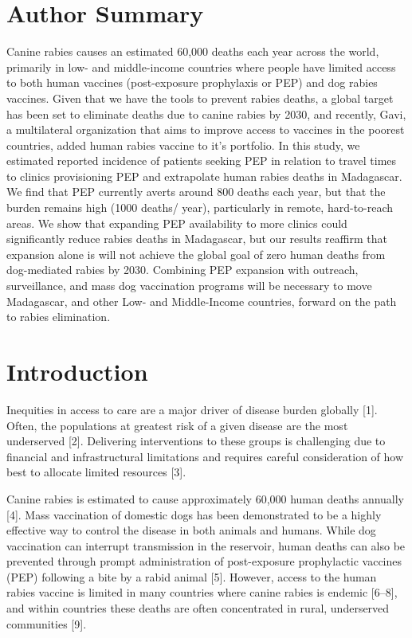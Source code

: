 \documentclass[
]{book}
\begin{document}
\hypertarget{author-summary}{%
\section*{Author Summary}\label{author-summary}}

Canine rabies causes an estimated 60,000 deaths each year across the
world, primarily in low- and middle-income countries where people have
limited access to both human vaccines (post-exposure prophylaxis or PEP)
and dog rabies vaccines. Given that we have the tools to prevent rabies
deaths, a global target has been set to eliminate deaths due to canine
rabies by 2030, and recently, Gavi, a multilateral organization that
aims to improve access to vaccines in the poorest countries, added human
rabies vaccine to it's portfolio. In this study, we estimated reported
incidence of patients seeking PEP in relation to travel times to clinics
provisioning PEP and extrapolate human rabies deaths in Madagascar. We
find that PEP currently averts around 800 deaths each year, but that the
burden remains high (1000 deaths/ year), particularly in remote,
hard-to-reach areas. We show that expanding PEP availability to more
clinics could significantly reduce rabies deaths in Madagascar, but our
results reaffirm that expansion alone is will not achieve the global
goal of zero human deaths from dog-mediated rabies by 2030. Combining
PEP expansion with outreach, surveillance, and mass dog vaccination
programs will be necessary to move Madagascar, and other Low- and
Middle-Income countries, forward on the path to rabies elimination.

\hypertarget{introduction-2}{%
\section{Introduction}\label{introduction-2}}

Inequities in access to care are a major driver of disease burden
globally {[}1{]}. Often, the populations at greatest risk of a given
disease are the most underserved {[}2{]}. Delivering interventions to
these groups is challenging due to financial and infrastructural
limitations and requires careful consideration of how best to allocate
limited resources {[}3{]}.

Canine rabies is estimated to cause approximately 60,000 human deaths
annually {[}4{]}. Mass vaccination of domestic dogs has been demonstrated
to be a highly effective way to control the disease in both animals and
humans. While dog vaccination can interrupt transmission in the
reservoir, human deaths can also be prevented through prompt
administration of post-exposure prophylactic vaccines (PEP) following a
bite by a rabid animal {[}5{]}. However, access to the human rabies
vaccine is limited in many countries where canine rabies is endemic
{[}6--8{]}, and within countries these deaths are often concentrated in
rural, underserved communities {[}9{]}.
\end{document}
